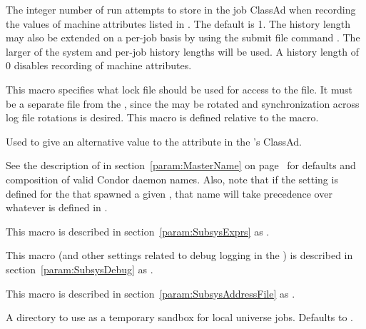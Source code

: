 \begin{description}
\label{param:SystemJobMachineAttrsHistoryLength}
\item[\Macro{SYSTEM\_JOB\_MACHINE\_ATTRS\_HISTORY\_LENGTH}]
  The integer number of run attempts to store in
  the job ClassAd when recording the values of machine attributes listed
  in .  The default is 1.
  The history length may also be extended on a per-job
  basis by using the submit file command
  .  The larger of the
  system and per-job history lengths will be used.  A history length of 0
  disables recording of machine attributes.

\label{param:ScheddLock}
\item[\Macro{SCHEDD\_LOCK}]
  This macro specifies what lock file should be used for access to the
   file.  It must be a separate file from the
  , since the  may be rotated and
  synchronization across log file rotations
  is desired.
  This macro is defined relative to the  macro.

\label{param:ScheddName}
\item[\Macro{SCHEDD\_NAME}]
  Used to give an alternative value to the  attribute 
  in the 's ClassAd.

  See the description of  in
  section~\ref{param:MasterName} on page~\pageref{param:MasterName}
  for defaults and composition of valid Condor daemon names.
  Also, note that if the  setting is defined for
  the  that spawned a given , that name
  will take precedence over whatever is defined in
  . 

\label{param:ScheddAttrs}
\item[\Macro{SCHEDD\_ATTRS}]
  This macro is described in section~\ref{param:SubsysExprs} as
  .

\label{param:ScheddDebug}
\item[\Macro{SCHEDD\_DEBUG}]
  This macro
  (and other settings related to debug logging in the ) is
  described in section~\ref{param:SubsysDebug} as
  .

\label{param:ScheddAddressFile}
\item[\Macro{SCHEDD\_ADDRESS\_FILE}]
  This macro is described in
  section~\ref{param:SubsysAddressFile} as
  . 

\label{param:ScheddExecute}
\item[\Macro{SCHEDD\_EXECUTE}]
  A directory to use as a temporary sandbox for local universe jobs.
  Defaults to .


\end{description}
